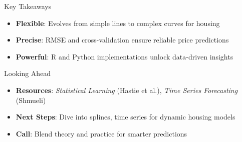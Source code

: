 \documentclass{beamer}
\begin{document}
	\begin{frame}{Key Takeaways}
		\begin{itemize}
			\item \textbf{Flexible}: Evolves from simple lines to complex curves for housing
			\item \textbf{Precise}: RMSE and cross-validation ensure reliable price predictions
			\item \textbf{Powerful}: R and Python implementations unlock data-driven insights
		\end{itemize}
	\end{frame}
	
	\begin{frame}{Looking Ahead}
		\begin{itemize}
			\item \textbf{Resources}: \textit{Statistical Learning} (Hastie et al.), \textit{Time Series Forecasting} (Shmueli)
			\item \textbf{Next Steps}: Dive into splines, time series for dynamic housing models
			\item \textbf{Call}: Blend theory and practice for smarter predictions
		\end{itemize}
	\end{frame}
	
\end{document}
